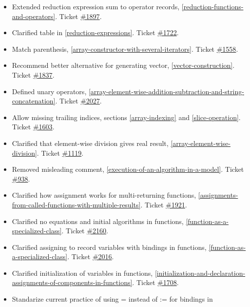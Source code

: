 \documentclass[10pt,a4paper]{report}
\begin{document}
\begin{itemize}
\item
  Extended reduction expression sum to operator records, \ref{reduction-functions-and-operators}.
  Ticket \href{https://trac.modelica.org/Modelica/ticket/1897}{\#1897}.
\item
  Clarified table in \ref{reduction-expressions}. Ticket
  \href{https://trac.modelica.org/Modelica/ticket/1722}{\#1722}.
\item
  Match parenthesis, \ref{array-constructor-with-several-iterators}. Ticket
  \href{https://trac.modelica.org/Modelica/ticket/1558}{\#1558}.
\item
  Recommend better alternative for generating vector, \ref{vector-construction}.
  Ticket \href{https://trac.modelica.org/Modelica/ticket/1837}{\#1837}.
\item
  Defined unary operators, \ref{array-element-wise-addition-subtraction-and-string-concatenation}. Ticket
  \href{https://trac.modelica.org/Modelica/ticket/2027}{\#2027}.
\item
  Allow missing trailing indices, sections \ref{array-indexing} and \ref{slice-operation}. Ticket
  \href{https://trac.modelica.org/Modelica/ticket/1603}{\#1603}.
\item
  Clarified that element-wise division gives real result, 
  \ref{array-element-wise-division}. Ticket
  \href{https://trac.modelica.org/Modelica/ticket/1119}{\#1119}.
\item
  Removed misleading comment, \ref{execution-of-an-algorithm-in-a-model}. Ticket
  \href{https://trac.modelica.org/Modelica/ticket/938}{\#938}.
\item
  Clarified how assignment works for multi-returning functions, 
  \ref{assignments-from-called-functions-with-multiple-results}. Ticket
  \href{https://trac.modelica.org/Modelica/ticket/1921}{\#1921}.
\item
  Clarified no equations and initial algorithms in functions, 
  \ref{function-as-a-specialized-class}. Ticket
  \href{https://trac.modelica.org/Modelica/ticket/2160}{\#2160}.
\item
  Clarified assigning to record variables with bindings in functions,
  \ref{function-as-a-specialized-class}. Ticket
  \href{https://trac.modelica.org/Modelica/ticket/2016}{\#2016}.
\item
  Clarified initialization of variables in functions, \ref{initialization-and-declaration-assignments-of-components-in-functions}.
  Ticket \href{https://trac.modelica.org/Modelica/ticket/1708}{\#1708}.
\item
  Standarize current practice of using = instead of := for bindings in

\end{itemize}
\end{document}
